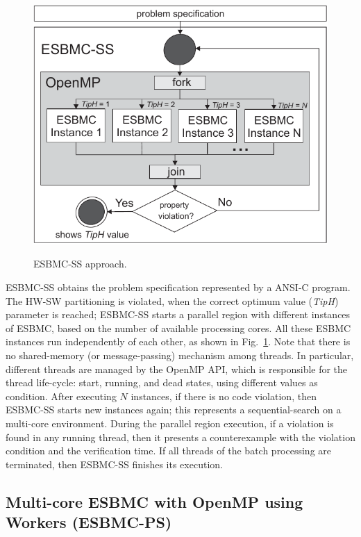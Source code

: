 \documentclass{doublecol-new}
\theoremstyle{TH}{
\newtheorem{lemma}{Lemma}
\newtheorem{theorem}[lemma]{Theorem}
\newtheorem{corrolary}[lemma]{Corrolary}
\newtheorem{conjecture}[lemma]{Conjecture}
\newtheorem{proposition}[lemma]{Proposition}
\newtheorem{claim}[lemma]{Claim}
\newtheorem{stheorem}[lemma]{Wrong Theorem}
\newtheorem{algorithm}{Algorithm}
}
\theoremstyle{THrm}{
\newtheorem{definition}{Definition}[section]
\newtheorem{question}{Question}[section]
\newtheorem{remark}{Remark}
\newtheorem{scheme}{Scheme}
}
\theoremstyle{THhit}{
\newtheorem{case}{Case}[section]
}
\begin{document}
\begin{figure}[h]
	\caption{ESBMC-SS approach.}
	\centering
	\includegraphics[scale=0.77]{figures/esbmc-ss.pdf} 	
	\label{ESBMC-Multi-core}
\end{figure}

ESBMC-SS obtains the problem specification represented by a ANSI-C program. The HW-SW partitioning is violated, when the correct optimum value (\textit{TipH}) parameter is reached; ESBMC-SS starts a parallel region with different instances of ESBMC, based on the number of available processing cores. All these ESBMC instances run independently of each other, as shown in Fig.~\ref{ESBMC-Multi-core}. Note that there is no shared-memory (or message-passing) mechanism among threads. In particular, different threads are managed by the OpenMP API, which is responsible for the thread life-cycle: start, running, and dead states, using different values as condition. After executing $N$ instances, if there is no code violation, then ESBMC-SS starts new instances again; this represents a sequential-search on a multi-core environment. During the parallel region execution, if a violation is found in any running thread, then it presents a counterexample with the violation condition and the verification time. If all threads of the batch processing are terminated, then ESBMC-SS finishes its execution.

\subsection{Multi-core ESBMC with OpenMP using Workers (ESBMC-PS)}
\label{Multi-core-ESBMC-with-OpenMP-using-workers}
\end{document}
